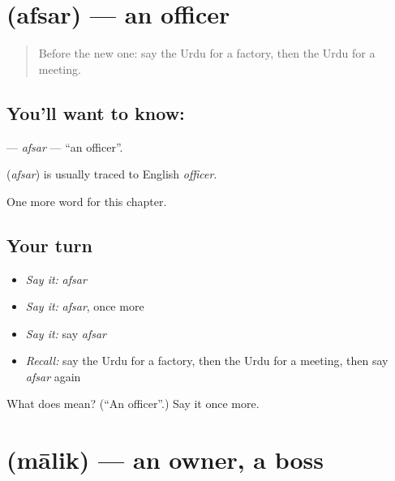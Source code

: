 \section[\texorpdfstring{\ur{افسر} (afsar)}{افسر (afsar)}]{ (afsar) — an officer}

\label{lesson:UR-C261-afsar}



\begin{quote}
Before the new one: say the Urdu for a factory, then the Urdu for a meeting.
\end{quote}

\subsection*{You'll want to know: }
\textbf{} — \emph{afsar} — \textquotedblleft{}an officer\textquotedblright{}.

\begin{cousinweb}
\textbf{} (\emph{afsar}) is usually traced to English \emph{officer}.
\end{cousinweb}

\begin{grammarlens}[title={What you've built}]
One more word for this chapter.
\end{grammarlens}

\subsection*{Your turn}
\begin{itemize}
\raggedright
  \item \emph{Say it:} \emph{afsar}
  \item \emph{Say it:} \emph{afsar}, once more
  \item \emph{Say it:} say \emph{afsar}
  \item \emph{Recall:} say the Urdu for a factory, then the Urdu for a meeting, then say \emph{afsar} again
\end{itemize}

\begin{tcolorbox}[breakable,colback=teal!4,colframe=teal!35!black,title={Before you move on}]
What does  mean? (\textquotedblleft{}An officer\textquotedblright{}.) Say it once more.
\end{tcolorbox}
\section[\texorpdfstring{\ur{مالک} (mālik)}{مالک (mālik)}]{ (mālik) — an owner, a boss}

